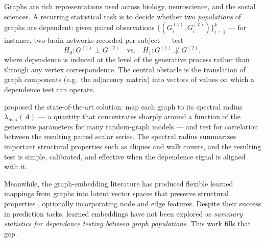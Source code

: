 \documentclass[11pt]{article}
\begin{document}
Graphs are rich representations used across biology, neuroscience, and the
social sciences. A recurring statistical task is to decide whether two
\emph{populations} of graphs are dependent: given paired observations
$\{(G^{(1)}_i, G^{(2)}_i)\}_{i=1}^{k}$ --- for instance, two brain networks
recorded per subject --- test
\[
H_0: G^{(1)} \perp G^{(2)}
\quad\text{vs.}\quad
H_1: G^{(1)} \not\perp G^{(2)},
\]
where dependence is induced at the level of the generative process rather than
through any vertex correspondence. The central obstacle is the translation of
graph components (e.g.\ the adjacency matrix) into vectors of values on which a
dependence test can operate.

\citet{fujita2017correlation} proposed the state-of-the-art solution: map each
graph to its spectral radius $\lambda_{\max}(A)$ --- a quantity that concentrates
sharply around a function of the generative parameters for many random-graph
models --- and test for correlation between the resulting paired scalar series.
The spectral radius summarizes important structural properties such as cliques
and walk counts, and the resulting test is simple, calibrated, and effective
when the dependence signal is aligned with it.

Meanwhile, the graph-embedding literature has produced flexible learned
mappings from graphs into latent vector spaces that preserve structural
properties \citep{cai2018survey, kipf2016variational}, optionally incorporating
node and edge features. Despite their success in prediction tasks, learned
embeddings have not been explored as \emph{summary statistics for dependence
testing between graph populations}. This work fills that gap.
\end{document}
